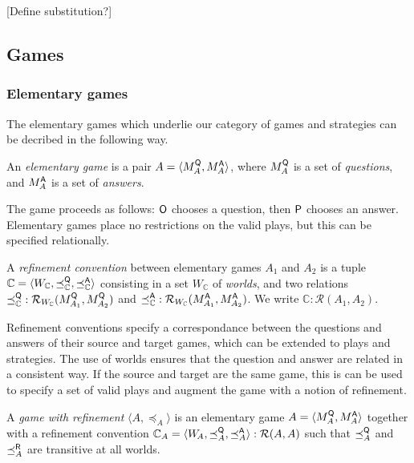 [Define substitution?]

\subsection{Games} %

\subsubsection{Elementary games} %

The elementary games which underlie
our category of games and strategies
can be decribed in the following way.

\begin{definition} %
An \emph{elementary game} is a pair
$A = \langle M_A^{ \mathsf{Q} }, M_A^{ \mathsf{A} } \rangle$, where
$M_A^{ \mathsf{Q} }$ is a set of \emph{questions}, and
$M_A^{ \mathsf{A} }$ is a set of \emph{answers}.
\end{definition}

The game proceeds as follows:
$ \mathsf{O} $ chooses a question, then
$ \mathsf{P} $ chooses an answer.
Elementary games place no restrictions
on the valid plays,
but this can be specified relationally.

\begin{definition} %
A \emph{refinement convention} between elementary games $A_1$ and $A_2$
is a tuple
$\mathbb{C} = \langle W_\mathbb{C}, \preceq_\mathbb{C}^{ \mathsf{Q} }, \preceq_\mathbb{C}^{ \mathsf{A} } \rangle$
consisting in a set $W_\mathbb{C}$ of \emph{worlds},
and two relations
${\preceq}_\mathbb{C}^{ \mathsf{Q} } : \mathcal{R}_{W_\mathbb{C}}(M_{A_1}^{ \mathsf{Q} },M_{A_2}^{ \mathsf{Q} })$ and
${\preceq}_\mathbb{C}^{ \mathsf{A} } : \mathcal{R}_{W_\mathbb{C}}(M_{A_1}^{ \mathsf{A} },M_{A_2}^{ \mathsf{A} })$.
We write $\mathbb{C} : \mathcal{R}(A_1, A_2)$.
\end{definition}

Refinement conventions specify a correspondance
between the questions and answers of their source and target games,
which can be extended to plays and strategies.
The use of worlds ensures that the question and answer
are related in a consistent way.
If the source and target are the same game,
this is can be used to specify a set of valid plays
and augment the game with a notion of refinement.

\begin{definition} %
A \emph{game with refinement} $\langle A, \preceq_A \rangle$
is an elementary game
$A = \langle M_A^{ \mathsf{Q} }, M_A^{ \mathsf{A} } \rangle$
together with a refinement convention
$\mathbb{C}_A = \langle W_{\!A}, {\preceq}_A^{ \mathsf{Q} }, {\preceq}_A^{ \mathsf{A} } \rangle
  : \mathcal{R}(A, A)$
such that $\preceq_A^{ \mathsf{Q} }$ and $\preceq_A^{ \mathsf{R} }$
are transitive at all worlds.
\end{definition}

